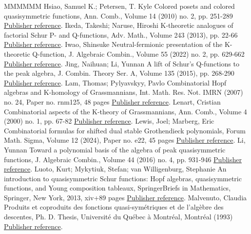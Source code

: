 \begin{thebibliography}{MMMMMM}
 Hsiao, Samuel K.; Petersen, T. Kyle Colored posets and colored quasisymmetric functions, Ann. Comb., Volume 14 (2010) no. 2, pp. 251-289 \href{https://alco.centre-mersenne.org/articles/10.5802/alco.362/#HsiaoPetersen}{Publisher reference}.
 Ikeda, Takeshi; Naruse, Hiroshi K-theoretic analogues of factorial Schur P- and Q-functions, Adv. Math., Volume 243 (2013), pp. 22-66 \href{https://alco.centre-mersenne.org/articles/10.5802/alco.362/#IkedaNaruse}{Publisher reference}.
 Iwao, Shinsuke Neutral-fermionic presentation of the K-theoretic Q-function, J. Algebraic Combin., Volume 55 (2022) no. 2, pp. 629-662 \href{https://alco.centre-mersenne.org/articles/10.5802/alco.362/#Iwao}{Publisher reference}.
 Jing, Naihuan; Li, Yunnan A lift of Schur’s Q-functions to the peak algebra, J. Combin. Theory Ser. A, Volume 135 (2015), pp. 268-290 \href{https://alco.centre-mersenne.org/articles/10.5802/alco.362/#JingLi}{Publisher reference}.
 Lam, Thomas; Pylyavskyy, Pavlo Combinatorial Hopf algebras and K-homology of Grassmannians, Int. Math. Res. Not. IMRN (2007) no. 24, Paper no. rnm125, 48 pages \href{https://alco.centre-mersenne.org/articles/10.5802/alco.362/#LamPyl}{Publisher reference}.
 Lenart, Cristian Combinatorial aspects of the K-theory of Grassmannians, Ann. Comb., Volume 4 (2000) no. 1, pp. 67-82 \href{https://alco.centre-mersenne.org/articles/10.5802/alco.362/#Lenart2000}{Publisher reference}.
 Lewis, Joel; Marberg, Eric Combinatorial formulas for shifted dual stable Grothendieck polynomials, Forum Math. Sigma, Volume 12 (2024), Paper no. e22, 45 pages \href{https://alco.centre-mersenne.org/articles/10.5802/alco.362/#LM2022}{Publisher reference}.
 Li, Yunnan Toward a polynomial basis of the algebra of peak quasisymmetric functions, J. Algebraic Combin., Volume 44 (2016) no. 4, pp. 931-946 \href{https://alco.centre-mersenne.org/articles/10.5802/alco.362/#Li2016}{Publisher reference}.
 Luoto, Kurt; Mykytiuk, Stefan; van Willigenburg, Stephanie An introduction to quasisymmetric Schur functions: Hopf algebras, quasisymmetric functions, and Young composition tableaux, SpringerBriefs in Mathematics, Springer, New York, 2013, xiv+89 pages \href{https://alco.centre-mersenne.org/articles/10.5802/alco.362/#LMW}{Publisher reference}.
 Malvenuto, Claudia Produits et coproduits des fonctions quasi-symétriques et de l’algèbre des descentes, Ph. D. Thesis, Université du Québec à Montréal, Montréal (1993) \href{https://alco.centre-mersenne.org/articles/10.5802/alco.362/#Malvenuto}{Publisher reference}.

\end{thebibliography}
